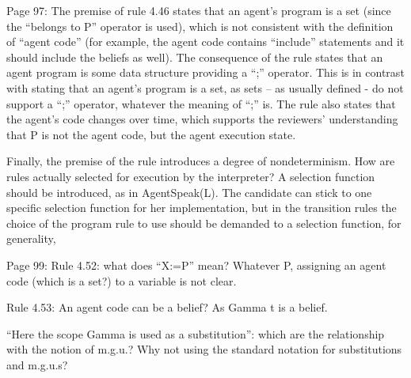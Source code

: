 \documentclass{article}
\newcommand{\todo}[1]{[\textcolor{red}{TODO}: #1]}
\newenvironment{them}{\noindent\begingroup\color{blue}}{\endgroup\par}
\begin{document}
\begin{them}

Page 97:
The premise of rule 4.46 states that an agent's program is a set (since the
“belongs to P” operator is used), which is not consistent with the definition
of “agent code” (for example, the agent code contains “include” statements and
it should include the beliefs as well). The consequence of the rule states that
an agent program is some data structure providing a “;” operator. This is in
contrast with stating that an agent's program is a set, as sets – as usually
defined - do not support a “;” operator, whatever the meaning of “;” is. The
rule also states that the agent's code changes over time, which supports the
reviewers' understanding that P is not the agent code, but the agent execution
state.

\end{them}
\todo{}

\begin{them}

Finally, the premise of the rule introduces a degree of nondeterminism. How are
rules actually selected for execution by the interpreter? A selection function
should be introduced, as in AgentSpeak(L). The candidate can stick to one
specific selection function for her implementation, but in the transition rules
the choice of the program rule to use should be demanded to a selection
function, for generality,

\end{them}
\todo{}

\begin{them}

Page 99:
Rule 4.52: what does “X:=P” mean? Whatever P, assigning an agent code (which is
a set?) to a variable is not clear.

\end{them}
\todo{}

\begin{them}

Rule 4.53:
An agent code can be a belief? As Gamma t is a belief.
\end{them}
\todo{}

\begin{them}

“Here the scope Gamma is used as a substitution”: which are the relationship
with the notion of m.g.u.? Why not using the standard notation for
substitutions and m.g.u.s?

\end{them}
\todo{}
\end{document}
